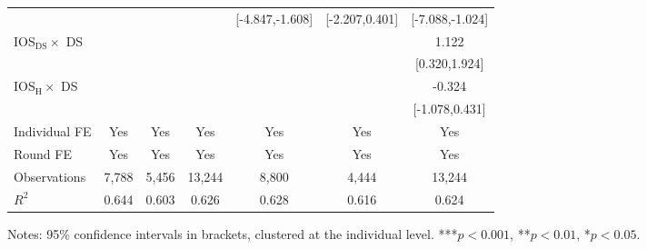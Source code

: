 \begin{table}[H]
\begin{threeparttable}
\begin{tabular}{l*{6}{c}}
            &                               &                               &                               &       [-4.847,-1.608]         &        [-2.207,0.401]         &       [-7.088,-1.024]         \\
\addlinespace
IOS$_{\text{DS}}\times$ DS&                               &                               &                               &                               &                               &                 1.122\sym{**} \\
            &                               &                               &                               &                               &                               &         [0.320,1.924]         \\
\addlinespace
IOS$_{\text{H}}\times$ DS&                               &                               &                               &                               &                               &                -0.324         \\
            &                               &                               &                               &                               &                               &        [-1.078,0.431]         \\
\midrule
Individual FE&                   Yes         &                   Yes         &                   Yes         &                   Yes         &                   Yes         &                   Yes         \\
Round FE    &                   Yes         &                   Yes         &                   Yes         &                   Yes         &                   Yes         &                   Yes         \\
Observations&                 7,788         &                 5,456         &                13,244         &                 8,800         &                 4,444         &                13,244         \\
$R^2$       &                 0.644         &                 0.603         &                 0.626         &                 0.628         &                 0.616         &                 0.624         \\
\bottomrule\bottomrule
\end{tabular}
\begin{tablenotes}
\footnotesize
\item Notes: 95\% confidence intervals in brackets, clustered at the individual level. ***$p<0.001$, **$p<0.01$, *$p<0.05$.
\end{tablenotes}
\end{threeparttable}
\end{table}
